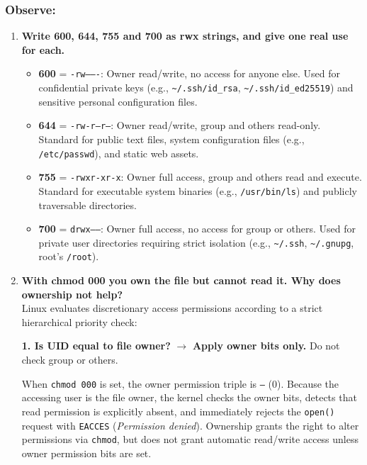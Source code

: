 \documentclass{labreport}
\begin{document}
\subsubsection*{Observe:}
\begin{enumerate}[leftmargin=*]
    \item \textbf{Write 600, 644, 755 and 700 as rwx strings, and give one real use for each.}
    \begin{itemize}[noitemsep, topsep=2pt]
        \item \textbf{600} = \texttt{-rw-------}: Owner read/write, no access for anyone else. Used for confidential private keys (e.g., \texttt{\textasciitilde/.ssh/id\_rsa}, \texttt{\textasciitilde/.ssh/id\_ed25519}) and sensitive personal configuration files.
        \item \textbf{644} = \texttt{-rw-r--r--}: Owner read/write, group and others read-only. Standard for public text files, system configuration files (e.g., \texttt{/etc/passwd}), and static web assets.
        \item \textbf{755} = \texttt{-rwxr-xr-x}: Owner full access, group and others read and execute. Standard for executable system binaries (e.g., \texttt{/usr/bin/ls}) and publicly traversable directories.
        \item \textbf{700} = \texttt{drwx------}: Owner full access, no access for group or others. Used for private user directories requiring strict isolation (e.g., \texttt{\textasciitilde/.ssh}, \texttt{\textasciitilde/.gnupg}, root's \texttt{/root}).
    \end{itemize}

    \item \textbf{With chmod 000 you own the file but cannot read it. Why does ownership not help?}\\[0.2em]
    Linux evaluates discretionary access permissions according to a strict hierarchical priority check:
    \begin{center}
    \textbf{1. Is UID equal to file owner?} $\longrightarrow$ \textbf{Apply owner bits only.} Do not check group or others.
    \end{center}
    When \texttt{chmod 000} is set, the owner permission triple is \texttt{---} (0). Because the accessing user is the file owner, the kernel checks the owner bits, detects that read permission is explicitly absent, and immediately rejects the \texttt{open()} request with \texttt{EACCES} (\textit{Permission denied}). Ownership grants the right to alter permissions via \texttt{chmod}, but does not grant automatic read/write access unless owner permission bits are set.


\end{enumerate}
\end{document}
